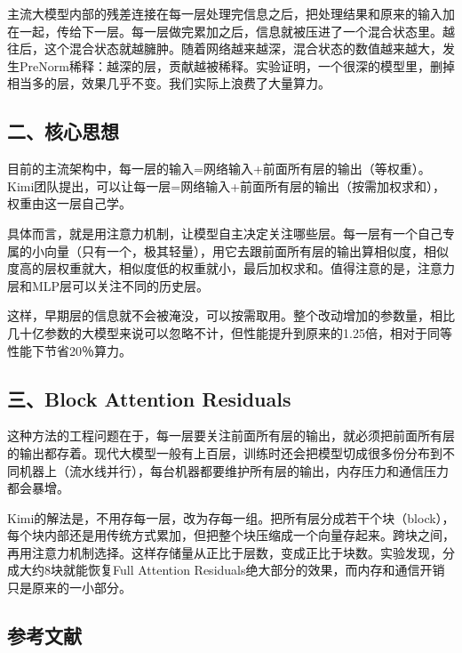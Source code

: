 主流大模型内部的残差连接在每一层处理完信息之后，把处理结果和原来的输入加在一起，传给下一层。每一层做完累加之后，信息就被压进了一个混合状态里。越往后，这个混合状态就越臃肿。随着网络越来越深，混合状态的数值越来越大，发生PreNorm稀释：越深的层，贡献越被稀释。实验证明，一个很深的模型里，删掉相当多的层，效果几乎不变。我们实际上浪费了大量算力。

\hypertarget{ux4e8cux6838ux5fc3ux601dux60f3-1}{%
\subsection{二、核心思想}\label{ux4e8cux6838ux5fc3ux601dux60f3-1}}

目前的主流架构中，每一层的输入=网络输入+前面所有层的输出（等权重）。Kimi团队提出，可以让每一层=网络输入+前面所有层的输出（按需加权求和），权重由这一层自己学。

具体而言，就是用注意力机制，让模型自主决定关注哪些层。每一层有一个自己专属的小向量（只有一个，极其轻量），用它去跟前面所有层的输出算相似度，相似度高的层权重就大，相似度低的权重就小，最后加权求和。值得注意的是，注意力层和MLP层可以关注不同的历史层。

这样，早期层的信息就不会被淹没，可以按需取用。整个改动增加的参数量，相比几十亿参数的大模型来说可以忽略不计，但性能提升到原来的1.25倍，相对于同等性能下节省20％算力。

\hypertarget{ux4e09block-attention-residuals}{%
\subsection{三、Block Attention Residuals}\label{ux4e09block-attention-residuals}}

这种方法的工程问题在于，每一层要关注前面所有层的输出，就必须把前面所有层的输出都存着。现代大模型一般有上百层，训练时还会把模型切成很多份分布到不同机器上（流水线并行），每台机器都要维护所有层的输出，内存压力和通信压力都会暴增。

Kimi的解法是，不用存每一层，改为存每一组。把所有层分成若干个块（block），每个块内部还是用传统方式累加，但把整个块压缩成一个向量存起来。跨块之间，再用注意力机制选择。这样存储量从正比于层数，变成正比于块数。实验发现，分成大约8块就能恢复Full Attention Residuals绝大部分的效果，而内存和通信开销只是原来的一小部分。

\hypertarget{ux53c2ux8003ux6587ux732e-104}{%
\subsection{参考文献}\label{ux53c2ux8003ux6587ux732e-104}}

